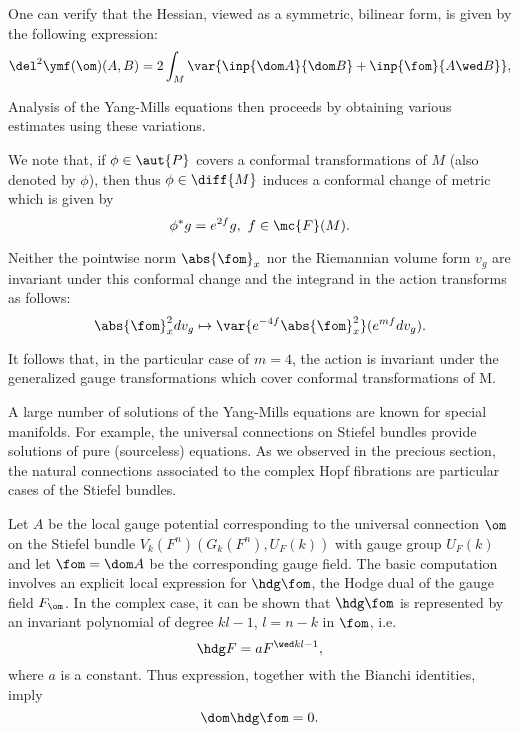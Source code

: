 One can verify that the Hessian, viewed as a symmetric, bilinear form, is given by the following expression:
$$
\del^{2}\ymf (\om )(A,B)=2\int_{M}\var{\inp{\dom A}{\dom B}+\inp{\fom}{A \wed B}},
$$

Analysis of the Yang-Mills equations then proceeds by obtaining various estimates using these variations.

We note that, if $\phi \in \aut{P}$ covers a conformal transformations of $M$ (also denoted by $\phi$), then thus
$\phi \in \diff{M}$ induces a conformal change of metric which is given by
\begin{equation}
 \label{MM:8.17}
 \phi^{*}g=e^{2f}g, \ f \in \mc{F}(M).
\end{equation}

Neither the pointwise norm $\abs{\fom}_{x}$ nor the Riemannian volume form $v_{g}$ are invariant under this conformal
change and the integrand in the \ym action transforms as follows:
\begin{equation}
 \label{MM:8.18}
 \abs{\fom}^{2}_{x}dv_{g}\mapsto \var{e^{-4f}\abs{\fom}^{2}_{x}}(e^{mf}dv_{g}).
\end{equation}

It follows that, in the particular case of $m=4$, the \ym action is invariant under the generalized gauge
transformations which cover conformal transformations of M.

A large number of solutions of the Yang-Mills equations are known for special manifolds. For example, the universal
connections on Stiefel bundles provide solutions of pure (sourceless) \ym equations. As we observed in the precious
section, the natural connections associated to the complex Hopf fibrations are particular cases of the Stiefel bundles.

Let $A$ be the local gauge potential corresponding to the universal connection $\om$ on the Stiefel bundle
$V_{k}(F^{n})(G_{k}(F^{n}), U_{F}(k))$ with gauge group $U_{F}(k)$ and let $\fom=\dom A$ be the corresponding gauge
field. The basic computation involves an explicit local expression for $\hdg \fom$, the Hodge dual of the gauge field
$F_{\om}$. In the complex case, it can be shown that $\hdg \fom$ is represented by an invariant polynomial of degree
$kl-1$, $l=n-k$ in $\fom$, i.e.
$$
\hdg F = a F^{\wed kl-1},
$$
where $a$ is a constant. Thus expression, together with the Bianchi identities, imply
\begin{equation}
 \label{MM:8.19}
 \dom \hdg \fom =0.
\end{equation}

